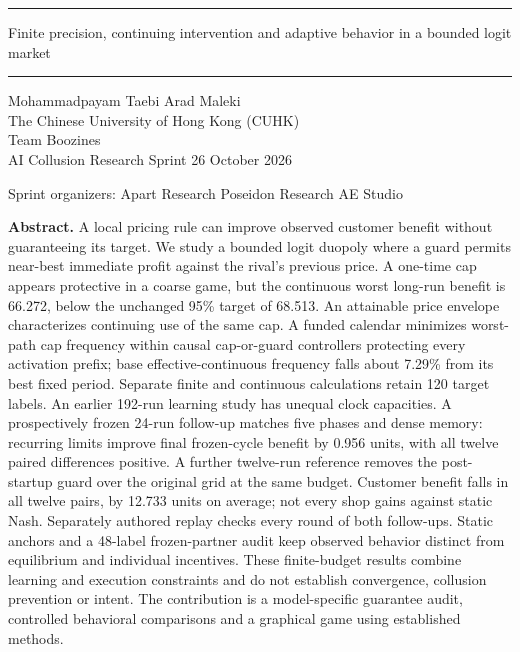 \documentclass[a4paper,10pt]{article}
\begin{document}
\fontsize{10.6}{13.2}\selectfont
\noindent\textcolor{ink}{\rule{\linewidth}{1.6pt}}



\begin{center}\end{center}

\begin{center}Finite precision, continuing intervention and adaptive behavior in a bounded logit market\end{center}

\noindent\textcolor{ink}{\rule{\linewidth}{0.5pt}}

\begin{center}Mohammadpayam Taebi \quad Arad Maleki\\
The Chinese University of Hong Kong (CUHK)\\
Team Boozines\\
AI Collusion Research Sprint \textperiodcentered{} 26 October 2026\end{center}

\begin{center}Sprint organizers: Apart Research \textperiodcentered{} Poseidon Research \textperiodcentered{} AE Studio\end{center}

{\fontsize{9.4}{11.6}\selectfont \textbf{Abstract.} A local pricing rule can improve observed customer benefit without guaranteeing its target. We study a bounded logit duopoly where a guard permits near-best immediate profit against the rival's previous price. A one-time cap appears protective in a coarse game, but the continuous worst long-run benefit is 66.272, below the unchanged 95\% target of 68.513. An attainable price envelope characterizes continuing use of the same cap. A funded calendar minimizes worst-path cap frequency within causal cap-or-guard controllers protecting every activation prefix; base effective-continuous frequency falls about 7.29\% from its best fixed period. Separate finite and continuous calculations retain 120 target labels. An earlier 192-run learning study has unequal clock capacities. A prospectively frozen 24-run follow-up matches five phases and dense memory: recurring limits improve final frozen-cycle benefit by 0.956 units, with all twelve paired differences positive. A further twelve-run reference removes the post-startup guard over the original grid at the same budget. Customer benefit falls in all twelve pairs, by 12.733 units on average; not every shop gains against static Nash. Separately authored replay checks every round of both follow-ups. Static anchors and a 48-label frozen-partner audit keep observed behavior distinct from equilibrium and individual incentives. These finite-budget results combine learning and execution constraints and do not establish convergence, collusion prevention or intent. The contribution is a model-specific guarantee audit, controlled behavioral comparisons and a graphical game using established methods.\par}
\end{document}

